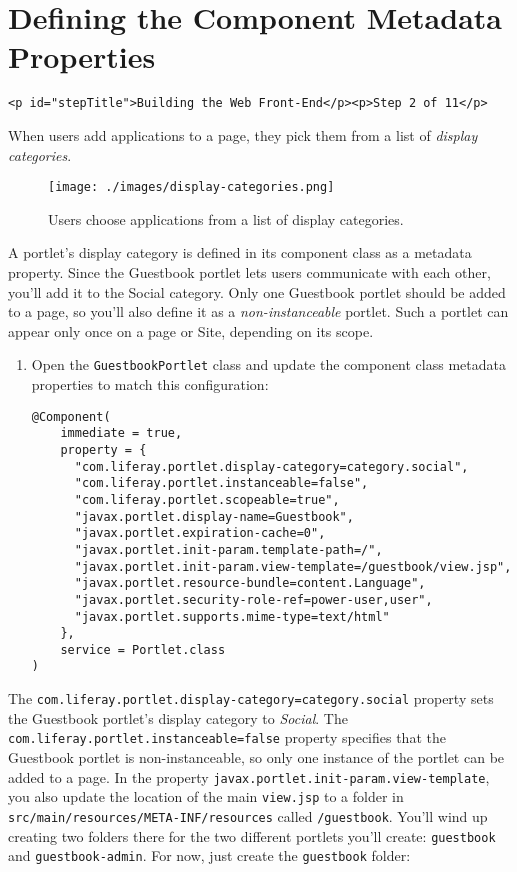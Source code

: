 \chapter{Defining the Component Metadata
Properties}\label{defining-the-component-metadata-properties}

\begin{verbatim}
<p id="stepTitle">Building the Web Front-End</p><p>Step 2 of 11</p>
\end{verbatim}

When users add applications to a page, they pick them from a list of
\emph{display categories}.

\begin{figure}
\centering
\texttt{[image: ./images/display-categories.png]}
\caption{Users choose applications from a list of display categories.}
\end{figure}

A portlet's display category is defined in its component class as a
metadata property. Since the Guestbook portlet lets users communicate
with each other, you'll add it to the Social category. Only one
Guestbook portlet should be added to a page, so you'll also define it as
a \emph{non-instanceable} portlet. Such a portlet can appear only once
on a page or Site, depending on its scope.

\begin{enumerate}
\def\labelenumi{\arabic{enumi}.}
\item
  Open the \texttt{GuestbookPortlet} class and update the component
  class metadata properties to match this configuration:

\begin{verbatim}
@Component(
    immediate = true,
    property = {
      "com.liferay.portlet.display-category=category.social",
      "com.liferay.portlet.instanceable=false",
      "com.liferay.portlet.scopeable=true",
      "javax.portlet.display-name=Guestbook",
      "javax.portlet.expiration-cache=0",
      "javax.portlet.init-param.template-path=/",
      "javax.portlet.init-param.view-template=/guestbook/view.jsp",
      "javax.portlet.resource-bundle=content.Language",
      "javax.portlet.security-role-ref=power-user,user",
      "javax.portlet.supports.mime-type=text/html"
    },
    service = Portlet.class
)
\end{verbatim}
\end{enumerate}

The \texttt{com.liferay.portlet.display-category=category.social}
property sets the Guestbook portlet's display category to \emph{Social}.
The \texttt{com.liferay.portlet.instanceable=false} property specifies
that the Guestbook portlet is non-instanceable, so only one instance of
the portlet can be added to a page. In the property
\texttt{javax.portlet.init-param.view-template}, you also update the
location of the main \texttt{view.jsp} to a folder in
\texttt{src/main/resources/META-INF/resources} called
\texttt{/guestbook}. You'll wind up creating two folders there for the
two different portlets you'll create: \texttt{guestbook} and
\texttt{guestbook-admin}. For now, just create the \texttt{guestbook}
folder:


